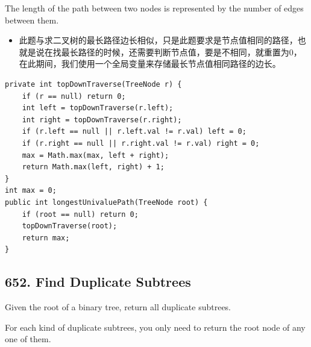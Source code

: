 \documentclass[9pt, b5paaper]{book}
\begin{document}
The length of the path between two nodes is represented by the number of edges between them.
\begin{itemize}
\item 此题与求二叉树的最长路径边长相似，只是此题要求是节点值相同的路径，也就是说在找最长路径的时候，还需要判断节点值，要是不相同，就重置为0，在此期间，我们使用一个全局变量来存储最长节点值相同路径的边长。
\end{itemize}
\begin{verbatim}
private int topDownTraverse(TreeNode r) { 
    if (r == null) return 0;
    int left = topDownTraverse(r.left);
    int right = topDownTraverse(r.right);
    if (r.left == null || r.left.val != r.val) left = 0;
    if (r.right == null || r.right.val != r.val) right = 0;
    max = Math.max(max, left + right);
    return Math.max(left, right) + 1;
}
int max = 0;
public int longestUnivaluePath(TreeNode root) {
    if (root == null) return 0;
    topDownTraverse(root);
    return max;
}
\end{verbatim}

\subsection{652. Find Duplicate Subtrees}
\label{sec-3-0-7}
Given the root of a binary tree, return all duplicate subtrees.

For each kind of duplicate subtrees, you only need to return the root node of any one of them.
\end{document}
